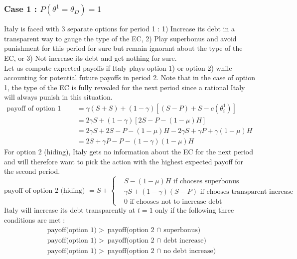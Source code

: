 \documentclass{article}
\begin{document}
\subsubsection*{Case 1 : $P(\theta^1=\theta_D)=1$}
Italy is faced with 3 separate options for period 1 : 1) Increase its debt in a transparent way to gauge the type of the EC, 2) Play superbonus and avoid punishment for this period for sure but remain ignorant about the type of the EC, or 3) Not increase its debt and get nothing for sure. \\
Let us compute expected payoffs if Italy plays option 1) or option 2) while accounting for potential future payoffs in period 2. Note that in the case of option 1, the type of the EC is fully revealed for the next period since a rational Italy will always punish in this situation. 
\begin{equation}
\begin{aligned}
    \text{payoff of option 1 (transparency) }&= \gamma(S+S) + (1-\gamma) [(S-P)+S-c(\theta_i^1)]\\
    &=2\gamma S+(1-\gamma)[2S-P-(1-\mu)H]\\
    &=2\gamma S+2S-P-(1-\mu)H-2\gamma S+\gamma P+\gamma(1-\mu)H\\
    &=2S+\gamma P-P-(1-\gamma)(1-\mu)H
\end{aligned}
\end{equation}
For option 2 (hiding), Italy gets no information about the EC for the next period and will therefore want to pick the action with the highest expected payoff for the second period. 
\begin{equation}
\text{payoff of option 2 (hiding) }=S+
\left\{
\begin{aligned}
     &S-(1-\mu)H \text{ if chooses superbonus}\\
     &\gamma S+ (1-\gamma)(S-P) \text{ if chooses transparent increase}\\
     &0 \text{ if chooses not to increase debt}
\end{aligned}
\right.
\end{equation}
Italy will increase its debt transparently at $t=1$ only if the following three conditions are met : 
\begin{equation}
\begin{aligned}
    &\text{payoff(option 1)}>\text{payoff(option 2 $\cap$ superbonus)}\\
    &\text{payoff(option 1)}>\text{payoff(option 2 $\cap$ debt increase)}\\
    &\text{payoff(option 1)}>\text{payoff(option 2 $\cap$ no debt increase)}
\end{aligned}
\end{equation}
\end{document}
